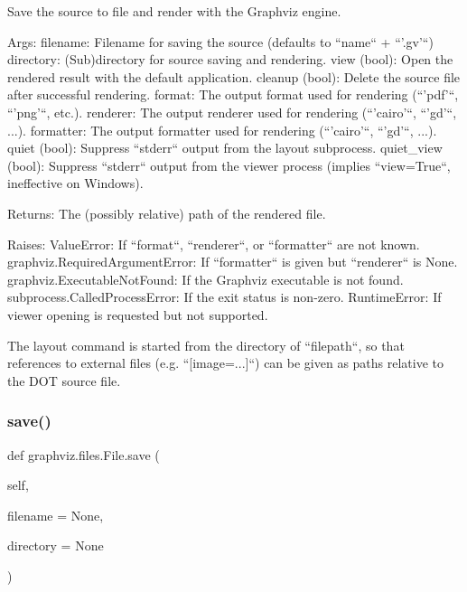 \begin{DoxyVerb}Save the source to file and render with the Graphviz engine.

Args:
    filename: Filename for saving the source (defaults to ``name`` + ``'.gv'``)
    directory: (Sub)directory for source saving and rendering.
    view (bool): Open the rendered result with the default application.
    cleanup (bool): Delete the source file after successful rendering.
    format: The output format used for rendering (``'pdf'``, ``'png'``, etc.).
    renderer: The output renderer used for rendering (``'cairo'``, ``'gd'``, ...).
    formatter: The output formatter used for rendering (``'cairo'``, ``'gd'``, ...).
    quiet (bool): Suppress ``stderr`` output from the layout subprocess.
    quiet_view (bool): Suppress ``stderr`` output from the viewer process
               (implies ``view=True``, ineffective on Windows).

Returns:
    The (possibly relative) path of the rendered file.

Raises:
    ValueError: If ``format``, ``renderer``, or ``formatter`` are not known.
    graphviz.RequiredArgumentError: If ``formatter`` is given but ``renderer`` is None.
    graphviz.ExecutableNotFound: If the Graphviz executable is not found.
    subprocess.CalledProcessError: If the exit status is non-zero.
    RuntimeError: If viewer opening is requested but not supported.

The layout command is started from the directory of ``filepath``, so that
references to external files (e.g. ``[image=...]``) can be given as paths
relative to the DOT source file.
\end{DoxyVerb}
 \mbox{\label{classgraphviz_1_1files_1_1File_aed3d654da952a817b9a070c34d13d813}} 
\subsubsection{\texorpdfstring{save()}{save()}}
{\footnotesize\ttfamily def graphviz.\+files.\+File.\+save (\begin{DoxyParamCaption}\item[{}]{self,  }\item[{}]{filename = {\ttfamily None},  }\item[{}]{directory = {\ttfamily None} }\end{DoxyParamCaption})}


